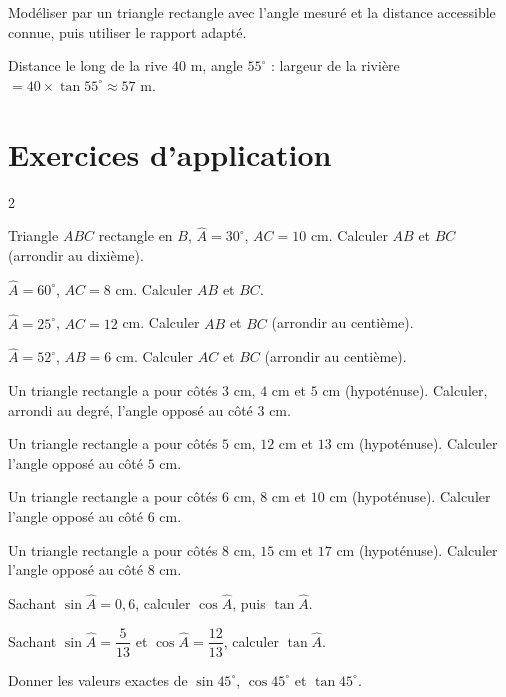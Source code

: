Modéliser par un triangle rectangle avec l'angle mesuré et la distance accessible connue,
puis utiliser le rapport adapté.
\begin{exemple}
Distance le long de la rive $40$ m, angle $55^{\circ}$ : largeur de la rivière
$=40\times\tan55^{\circ}\approx57$ m.
\end{exemple}

\section{Exercices d'application}
\begin{multicols}{2}

\exo{} Triangle $ABC$ rectangle en $B$, $\widehat A=30^{\circ}$, $AC=10$ cm.
Calculer $AB$ et $BC$ (arrondir au dixième).

\exo{} $\widehat A=60^{\circ}$, $AC=8$ cm. Calculer $AB$ et $BC$.

\exo{} $\widehat A=25^{\circ}$, $AC=12$ cm. Calculer $AB$ et $BC$ (arrondir au
centième).

\exo{} $\widehat A=52^{\circ}$, $AB=6$ cm. Calculer $AC$ et $BC$ (arrondir au
centième).

\exo{} Un triangle rectangle a pour côtés $3$ cm, $4$ cm et $5$ cm (hypoténuse).
Calculer, arrondi au degré, l'angle opposé au côté $3$ cm.

\exo{} Un triangle rectangle a pour côtés $5$ cm, $12$ cm et $13$ cm (hypoténuse).
Calculer l'angle opposé au côté $5$ cm.

\exo{} Un triangle rectangle a pour côtés $6$ cm, $8$ cm et $10$ cm (hypoténuse).
Calculer l'angle opposé au côté $6$ cm.

\exo{} Un triangle rectangle a pour côtés $8$ cm, $15$ cm et $17$ cm (hypoténuse).
Calculer l'angle opposé au côté $8$ cm.

\exo{} Sachant $\sin\widehat A=0{,}6$, calculer $\cos\widehat A$, puis
$\tan\widehat A$.

\exo{} Sachant $\sin\widehat A=\dfrac5{13}$ et $\cos\widehat A=\dfrac{12}{13}$,
calculer $\tan\widehat A$.

\exo{} Donner les valeurs exactes de $\sin45^{\circ}$, $\cos45^{\circ}$ et
$\tan45^{\circ}$.


\end{multicols}
